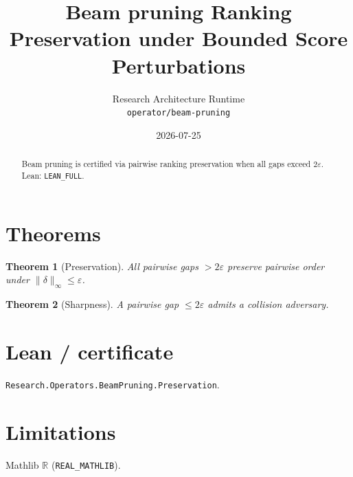 \documentclass[11pt]{article}
\title{Beam pruning Ranking Preservation under Bounded Score Perturbations}
\author{Research Architecture Runtime \\ \texttt{operator/beam-pruning}}
\date{2026-07-25}
\newtheorem{theorem}{Theorem}
\begin{document}
\maketitle
\begin{abstract}
Beam pruning is certified via pairwise ranking preservation when all gaps exceed $2\varepsilon$. Lean: \texttt{LEAN\_FULL}.
\end{abstract}
\section{Theorems}
\begin{theorem}[Preservation]
All pairwise gaps $>2\varepsilon$ preserve pairwise order under $\|\delta\|_\infty\le\varepsilon$.
\end{theorem}
\begin{theorem}[Sharpness]
A pairwise gap $\le 2\varepsilon$ admits a collision adversary.
\end{theorem}
\section{Lean / certificate}
\texttt{Research.Operators.BeamPruning.Preservation}.
\section{Limitations}
Mathlib $\mathbb{R}$ (\texttt{REAL\_MATHLIB}).
\end{document}
